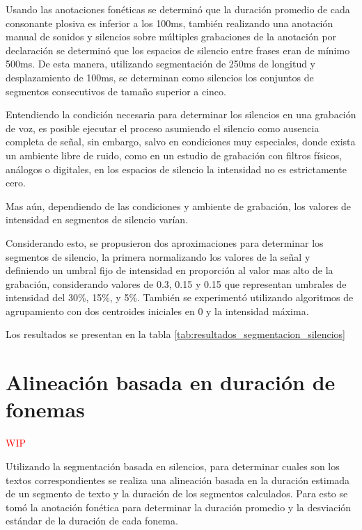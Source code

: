 Usando las anotaciones fonéticas se determinó que la duración promedio de cada consonante plosiva es inferior a los 100ms, también realizando una anotación manual de sonidos y silencios sobre múltiples grabaciones de la anotación por declaración se determinó que los espacios de silencio entre frases eran de mínimo 500ms. De esta manera, utilizando segmentación de 250ms de longitud y desplazamiento de 100ms, se determinan como silencios los conjuntos de segmentos consecutivos de tamaño superior a cinco. 

Entendiendo la condición necesaria para determinar los silencios en una grabación de voz, es posible ejecutar el proceso asumiendo el silencio como ausencia completa de señal, sin embargo, salvo en condiciones muy especiales, donde exista un ambiente libre de ruido, como en un estudio de grabación con filtros físicos, análogos o digitales, en los espacios de silencio la intensidad no es estrictamente cero.

Mas aún, dependiendo de las condiciones y ambiente de grabación, los valores de intensidad en segmentos de silencio varían.

Considerando esto, se propusieron dos aproximaciones para determinar los segmentos de silencio, la primera normalizando los valores de la señal y definiendo un umbral fijo de intensidad en proporción al valor mas alto de la grabación, considerando valores de 0.3, 0.15 y 0.15 que representan umbrales de intensidad del 30\%, 15\%, y 5\%. También se experimentó utilizando algoritmos de agrupamiento con dos centroides iniciales en 0 y la intensidad máxima.

Los resultados se presentan en la tabla \ref{tab:resultados_segmentacion_silencios}




\section{Alineación basada en duración de fonemas}

\textcolor{red}{WIP}

Utilizando la segmentación basada en silencios, para determinar cuales son los textos correspondientes se realiza una alineación basada en la duración estimada de un segmento de texto y la duración de los segmentos calculados. Para esto se tomó la anotación fonética para determinar la duración promedio y la desviación estándar de la duración de cada fonema.

